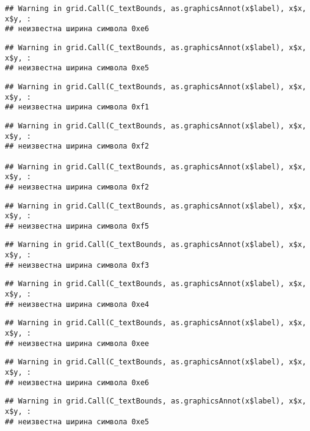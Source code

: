 \documentclass[
]{article}
\begin{document}
\begin{verbatim}
## Warning in grid.Call(C_textBounds, as.graphicsAnnot(x$label), x$x, x$y, :
## неизвестна ширина символа 0xe6
\end{verbatim}

\begin{verbatim}
## Warning in grid.Call(C_textBounds, as.graphicsAnnot(x$label), x$x, x$y, :
## неизвестна ширина символа 0xe5
\end{verbatim}

\begin{verbatim}
## Warning in grid.Call(C_textBounds, as.graphicsAnnot(x$label), x$x, x$y, :
## неизвестна ширина символа 0xf1
\end{verbatim}

\begin{verbatim}
## Warning in grid.Call(C_textBounds, as.graphicsAnnot(x$label), x$x, x$y, :
## неизвестна ширина символа 0xf2

## Warning in grid.Call(C_textBounds, as.graphicsAnnot(x$label), x$x, x$y, :
## неизвестна ширина символа 0xf2
\end{verbatim}

\begin{verbatim}
## Warning in grid.Call(C_textBounds, as.graphicsAnnot(x$label), x$x, x$y, :
## неизвестна ширина символа 0xf5
\end{verbatim}

\begin{verbatim}
## Warning in grid.Call(C_textBounds, as.graphicsAnnot(x$label), x$x, x$y, :
## неизвестна ширина символа 0xf3
\end{verbatim}

\begin{verbatim}
## Warning in grid.Call(C_textBounds, as.graphicsAnnot(x$label), x$x, x$y, :
## неизвестна ширина символа 0xe4
\end{verbatim}

\begin{verbatim}
## Warning in grid.Call(C_textBounds, as.graphicsAnnot(x$label), x$x, x$y, :
## неизвестна ширина символа 0xee
\end{verbatim}

\begin{verbatim}
## Warning in grid.Call(C_textBounds, as.graphicsAnnot(x$label), x$x, x$y, :
## неизвестна ширина символа 0xe6
\end{verbatim}

\begin{verbatim}
## Warning in grid.Call(C_textBounds, as.graphicsAnnot(x$label), x$x, x$y, :
## неизвестна ширина символа 0xe5
\end{verbatim}
\end{document}

